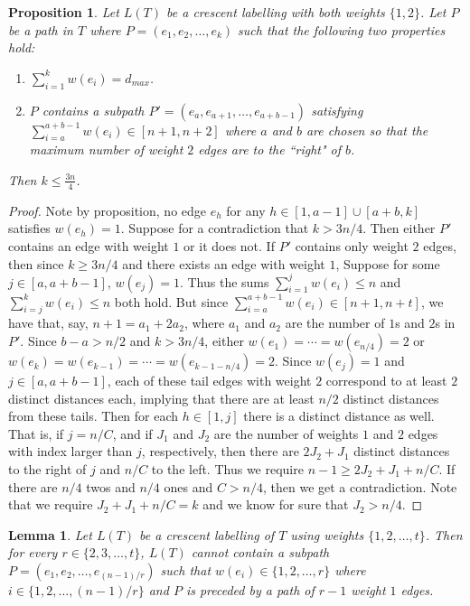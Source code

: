 \documentclass[12]{article}
\newtheorem{lem}{Lemma} %
\newtheorem{prop}[thm]{Proposition}
\theoremstyle{definition}
\begin{document}
\begin{prop}
	Let $L(T)$ be a crescent labelling with both weights $\{1,2\}$.  Let $P$ be a path in $T$ where $P= (e_1,e_2,\ldots,e_k)$ such that the following two properties hold:
	\begin{enumerate}
		\item $\sum_{i=1}^{k} w(e_i) = d_{max}$.
		
		\item $P$ contains a subpath $P' = (e_a,e_{a+1},\ldots,e_{a+b-1})$ satisfying $\sum_{i=a}^{a+b-1} w(e_i) \in [n+1, n+2]$ where $a$ and $b$ are chosen so that the maximum number of weight $2$ edges are to the ``right" of $b$.
		
	\end{enumerate}
	  Then $k \leq \tfrac{3n}{4}$.
\end{prop}

\begin{proof}
	Note by proposition, no edge $e_h$ for any $h \in [1,a-1] \cup [a+b,k]$ satisfies $w(e_h) = 1$.  Suppose for a contradiction that $k> 3n/4$.  Then either $P'$ contains an edge with weight $1$ or it does not.  If $P'$ contains only weight $2$ edges, then since $k \geq 3n/4$ and there exists an edge with weight $1$, Suppose for some $j \in [a,a+b-1]$, $w(e_{j}) = 1$.    Thus the sums $\sum_{i=1}^j w(e_i) \leq n$ and $\sum_{i=j}^{k} w(e_i) \leq n$ both hold.  But since $\sum_{i=a}^{a+b-1} w(e_i) \in [n+1, n+t]$, we have that, say, $n+1 = a_1 + 2a_2$, where $a_1$ and $a_2$ are the number of $1$s and $2$s in $P'$.  Since $b-a > n/2$ and $k > 3n/4$, either $w(e_1) = \cdots = w(e_{n/4}) =2 $ or $w(e_k) = w(e_{k-1}) = \cdots = w(e_{k-1-n/4}) = 2$.  Since $w(e_j) = 1$ and $j \in [a,a+b-1]$, each of these tail edges with weight $2$ correspond to at least $2$ distinct distances each, implying that there are at least $n/2$ distinct distances from these tails.  Then for each $h \in [1,j]$ there is a distinct distance as well.  That is, if $j = n/C$, and if $J_1$ and $J_2$ are the number of weights $1$ and $2$ edges with index larger than $j$, respectively, then there are $2J_2 + J_1$ distinct distances to the right of $j$ and $n/C$ to the left.  Thus we require $n-1 \geq 2J_2 + J_1 + n/C$.  If there are $n/4$ twos and $n/4$ ones and $C > n/4$, then we get a contradiction.  Note that we require $J_2 + J_1 + n/C = k$ and we know for sure that $J_2 > n/4$.
\end{proof}

\begin{lem}
	Let $L(T)$ be a crescent labelling of $T$ using weights $\{1,2,\ldots,t\}$.  Then for every $r \in \{2,3,\ldots,t\}$, $L(T)$ cannot contain a subpath $P = (e_1,e_2,\ldots,e_{(n-1)/r})$ such that $w(e_i) \in \{1,2,\ldots,r\}$ where $i \in \{1,2,\ldots,(n-1)/r\}$ and $P$ is preceded by a path of $r-1$ weight $1$ edges.
\end{lem}
\end{document}
